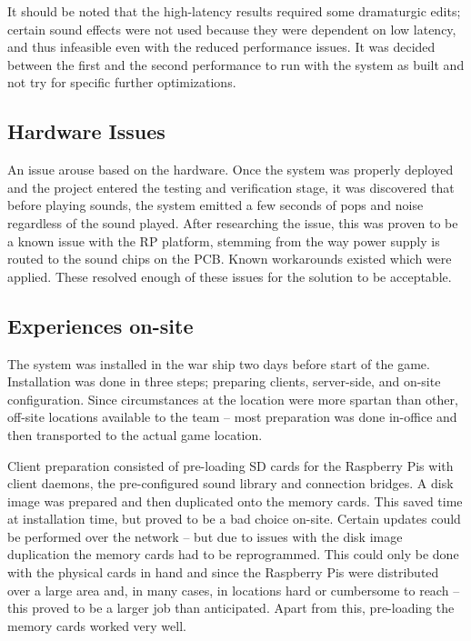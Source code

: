It should be noted that the high-latency results required some
dramaturgic edits; certain sound effects were not used because they
were dependent on low latency, and thus infeasible even with the
reduced performance issues. It was decided between the first and the
second performance to run with the system as built and not try for
specific further optimizations.

\subsection{Hardware Issues}
\label{sec:hardware-issues}
An issue arouse based on the hardware. Once the system was properly deployed and the project entered
the testing and verification stage, it was discovered that before playing sounds, the system emitted a few seconds of pops and noise regardless of the sound played. After researching the issue, this was proven to be a known issue with the RP platform, stemming from the way power supply is routed to the sound chips on the PCB\@. Known workarounds existed which were applied.  These resolved enough of these issues for the solution to be acceptable.

\subsection{Experiences on-site}
\label{sec:experiences-on-site}

The system was installed in the war ship two days before start of the game. Installation was done in three steps; preparing clients, server-side, and on-site configuration. Since circumstances at the location were more spartan than other, off-site locations available to the team -- most preparation was done in-office and then transported to the actual game location. 

Client preparation consisted of pre-loading SD cards for the Raspberry Pis with client daemons, the pre-configured sound library and connection bridges. A disk image was prepared and then duplicated onto the memory cards. This saved time at installation time, but proved to be a bad choice on-site. Certain updates could be performed over the network -- but due to issues with the disk image duplication the memory cards had to be reprogrammed. This could only be done with the physical cards in hand and since the Raspberry Pis were distributed over a large area and, in many cases, in locations hard or cumbersome to reach -- this proved to be a larger job than anticipated. Apart from this, pre-loading the memory cards worked very well. 

